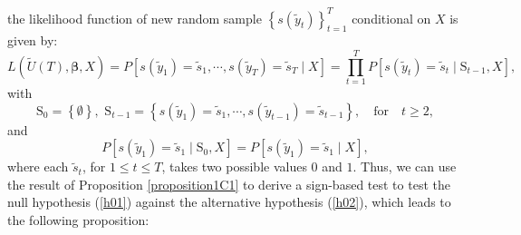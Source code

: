 \documentclass[harvard,11pt]{article}
\begin{document}
the likelihood function of new random sample $\left\{ s(\tilde{y}_{t})\right\}
_{t=1}^{T}$ conditional on $X$ is given by:%
\begin{equation*}
L\left( \tilde{U}(T),\bm{\beta}, X \right) =P\left[ s(\tilde{y}%
_{1})=\tilde{s}_{1},\cdots,s(\tilde{y}_{T})=\tilde{s}_{T}\mid X\right] =\prod\limits_{t=1}^{T} P\left[ s(\tilde{y}_{t})=\tilde{s}_{t}\mid 
\text{\~{S}}_{t-1},X\right] ,
\end{equation*}%
with 
\begin{equation*}
\text{\~{S}}_{0}=\left\{ \emptyset \right\} ,\text{\ \~{S}}_{t-1}=\left\{
s(\tilde{y}_{1})=\tilde{s}_{1},\cdots,s(\tilde{y}_{t-1})=\tilde{s}%
_{t-1}\right\} ,\quad\text{for}\quad t\geq 2,
\end{equation*}%
and%
\begin{equation*}
P\left[ s(\tilde{y}_{1})=\tilde{s}_{1}\mid \text{\~{S}}_{0},X\right] =%
P\left[ s(\tilde{y}_{1})=\tilde{s}_{1}\mid X\right] ,
\end{equation*}%
where each $\tilde{s}_{t}$, for $1\leq t\leq T$, takes two possible values $%
0 $ and $1$. Thus, we can use the result of Proposition \ref{proposition1C1}
to derive a sign-based test to test the null hypothesis (\ref{h01}) against
the alternative hypothesis (\ref{h02}), which leads to the following proposition:
\end{document}

